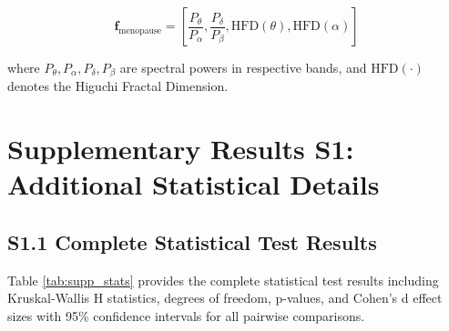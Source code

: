 \documentclass[ASNA,twocolumn]{USG}
\begin{document}
\[
\mathbf{f}_{\text{menopause}} = \left[ \frac{P_{\theta}}{P_{\alpha}}, \frac{P_{\delta}}{P_{\beta}}, \text{HFD}(\theta), \text{HFD}(\alpha) \right]
\]

where $P_{\theta}, P_{\alpha}, P_{\delta}, P_{\beta}$ are spectral powers in respective bands, and $\text{HFD}(\cdot)$ denotes the Higuchi Fractal Dimension.

\section*{Supplementary Results S1: Additional Statistical Details}

\subsection*{S1.1 Complete Statistical Test Results}

Table \ref{tab:supp_stats} provides the complete statistical test results including Kruskal-Wallis H statistics, degrees of freedom, p-values, and Cohen's d effect sizes with 95\% confidence intervals for all pairwise comparisons.
\end{document}
